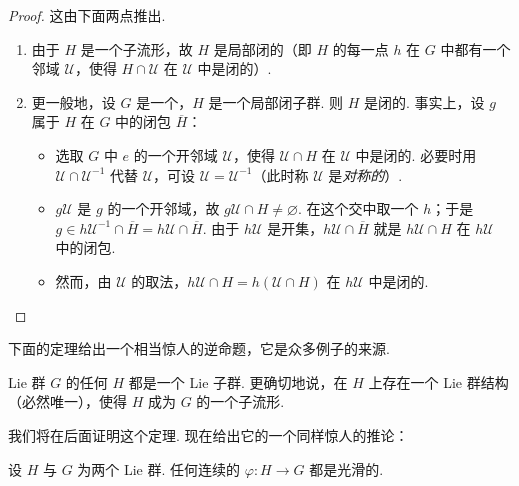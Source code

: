 \begin{proof}
这由下面两点推出.
\begin{enumerate}[label=\roman*)]
\item 由于 $H$ 是一个子流形，故 $H$ 是局部闭的（即 $H$ 的每一点 $h$ 在 $G$ 中都有一个邻域 $\mathcal{U}$，使得 $H\cap\mathcal{U}$ 在 $\mathcal{U}$ 中是闭的）.
\item 更一般地，设 $G$ 是一个，$H$ 是一个局部闭子群. 则 $H$ 是闭的. 事实上，设 $g$ 属于 $H$ 在 $G$ 中的闭包 $\overline{H}$：
\begin{itemize}[label=--]
\item 选取 $G$ 中 $e$ 的一个开邻域 $\mathcal{U}$，使得 $\mathcal{U}\cap H$ 在 $\mathcal{U}$ 中是闭的. 必要时用 $\mathcal{U}\cap\mathcal{U}^{-1}$ 代替 $\mathcal{U}$，可设 $\mathcal{U}=\mathcal{U}^{-1}$（此时称 $\mathcal{U}$ 是\emph{对称的}）.
\item $g\mathcal{U}$ 是 $g$ 的一个开邻域，故 $g\mathcal{U}\cap H\neq\varnothing$. 在这个交中取一个 $h$；于是 $g\in h\mathcal{U}^{-1}\cap\overline{H}=h\mathcal{U}\cap\overline{H}$. 由于 $h\mathcal{U}$ 是开集，$h\mathcal{U}\cap\overline{H}$ 就是 $h\mathcal{U}\cap H$ 在 $h\mathcal{U}$ 中的闭包.
\item 然而，由 $\mathcal{U}$ 的取法，$h\mathcal{U}\cap H=h(\mathcal{U}\cap H)$ 在 $h\mathcal{U}$ 中是闭的.
\end{itemize}
\end{enumerate}
\end{proof}

下面的定理给出一个相当惊人的逆命题，它是众多例子的来源.

\begin{theorem}\label{thm:lie-1-1-8}
Lie 群 $G$ 的任何 $H$ 都是一个 Lie 子群. 更确切地说，在 $H$ 上存在一个 Lie 群结构（必然唯一），使得 $H$ 成为 $G$ 的一个子流形.
\end{theorem}

我们将在后面证明这个定理. 现在给出它的一个同样惊人的推论：

\begin{corollary}\label{cor:lie-1-1-9}
设 $H$ 与 $G$ 为两个 Lie 群. 任何连续的 $\varphi:H\longrightarrow G$ 都是光滑的.
\end{corollary}

